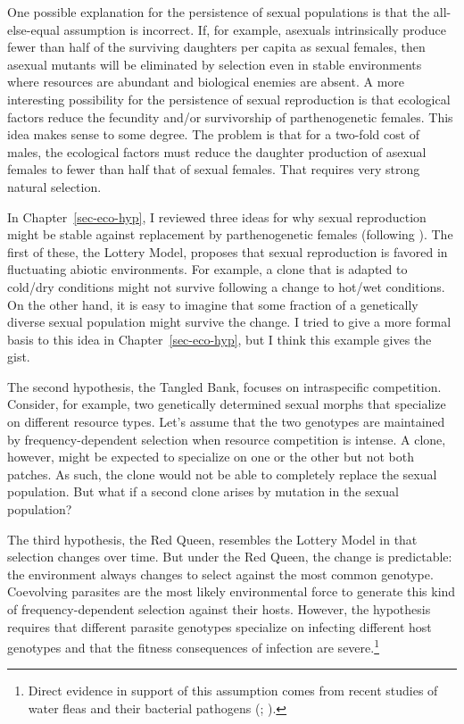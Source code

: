 \documentclass[
  letterpaper,
]{book}
\begin{document}
One possible explanation for the persistence of sexual populations is
that the all-else-equal assumption is incorrect. If, for example,
asexuals intrinsically produce fewer than half of the surviving
daughters per capita as sexual females, then asexual mutants will be
eliminated by selection even in stable environments where resources are
abundant and biological enemies are absent. A more interesting
possibility for the persistence of sexual reproduction is that
ecological factors reduce the fecundity and/or survivorship of
parthenogenetic females. This idea makes sense to some degree. The
problem is that for a two-fold cost of males, the ecological factors
must reduce the daughter production of asexual females to fewer than
half that of sexual females. That requires very strong natural
selection.

In Chapter~\ref{sec-eco-hyp}, I reviewed three ideas for why sexual
reproduction might be stable against replacement by parthenogenetic
females (following ). The first of
these, the Lottery Model, proposes that sexual reproduction is favored
in fluctuating abiotic environments. For example, a clone that is
adapted to cold/dry conditions might not survive following a change to
hot/wet conditions. On the other hand, it is easy to imagine that some
fraction of a genetically diverse sexual population might survive the
change. I tried to give a more formal basis to this idea in
Chapter~\ref{sec-eco-hyp}, but I think this example gives the gist.

The second hypothesis, the Tangled Bank, focuses on intraspecific
competition. Consider, for example, two genetically determined sexual
morphs that specialize on different resource types. Let's assume that
the two genotypes are maintained by frequency-dependent selection when
resource competition is intense. A clone, however, might be expected to
specialize on one or the other but not both patches. As such, the clone
would not be able to completely replace the sexual population. But what
if a second clone arises by mutation in the sexual population?

The third hypothesis, the Red Queen, resembles the Lottery Model in that
selection changes over time. But under the Red Queen, the change is
predictable: the environment always changes to select against the most
common genotype. Coevolving parasites are the most likely environmental
force to generate this kind of frequency-dependent selection against
their hosts. However, the hypothesis requires that different parasite
genotypes specialize on infecting different host genotypes and that the
fitness consequences of infection are severe.\footnote{Direct evidence
  in support of this assumption comes from recent studies of water fleas
  and their bacterial pathogens (; ).}
\end{document}
